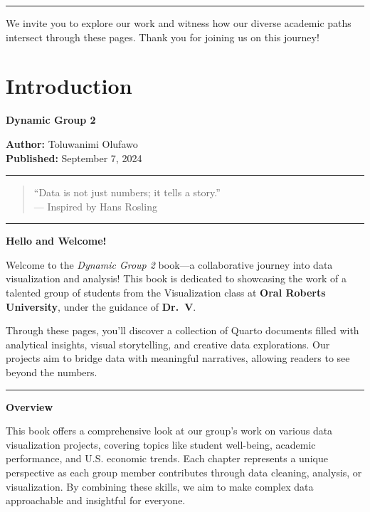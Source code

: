 \documentclass[
  letterpaper,
  DIV=11,
  numbers=noendperiod]{scrreprt}
\begin{document}
\begin{center}\rule{0.5\linewidth}{0.5pt}\end{center}

We invite you to explore our work and witness how our diverse academic
paths intersect through these pages. Thank you for joining us on this
journey!


\chapter{Introduction}\label{introduction}

\textbf{Dynamic Group 2}

\textbf{Author:} Toluwanimi Olufawo\\
\textbf{Published:} September 7, 2024

\begin{center}\rule{0.5\linewidth}{0.5pt}\end{center}

\begin{quote}
``Data is not just numbers; it tells a story.''\\
--- Inspired by Hans Rosling
\end{quote}

\begin{center}\rule{0.5\linewidth}{0.5pt}\end{center}

\textbf{Hello and Welcome!}

Welcome to the \emph{Dynamic Group 2} book---a collaborative journey
into data visualization and analysis! This book is dedicated to
showcasing the work of a talented group of students from the
Visualization class at \textbf{Oral Roberts University}, under the
guidance of \textbf{Dr.~V}.

Through these pages, you'll discover a collection of Quarto documents
filled with analytical insights, visual storytelling, and creative data
explorations. Our projects aim to bridge data with meaningful
narratives, allowing readers to see beyond the numbers.

\begin{center}\rule{0.5\linewidth}{0.5pt}\end{center}

\textbf{Overview}

This book offers a comprehensive look at our group's work on various
data visualization projects, covering topics like student well-being,
academic performance, and U.S. economic trends. Each chapter represents
a unique perspective as each group member contributes through data
cleaning, analysis, or visualization. By combining these skills, we aim
to make complex data approachable and insightful for everyone.
\end{document}
